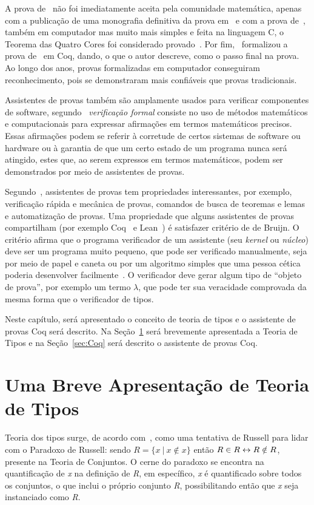 	A prova de~ não foi imediatamente aceita pela comunidade matemática, apenas com a publicação de uma monografia definitiva da prova
	em~ e com a prova de~, também em computador mas muito mais simples e feita na linguagem C, o Teorema
	das Quatro Cores foi considerado provado~\cite{gonthier2005computer}. Por fim,~ formalizou a prova de~ em Coq, dando,
	o que o autor descreve, como o passo final na prova. Ao longo dos anos, provas formalizadas em computador conseguiram reconhecimento, pois se
	demonstraram mais confiáveis que provas tradicionais.

	Assistentes de provas também são amplamente usados para verificar componentes de software, segundo~ \textit{verificação formal}
	consiste no uso de métodos matemáticos e computacionais para expressar afirmações em termos matemáticos precisos. Essas afirmações podem se referir à corretude
	de certos sistemas de software ou hardware ou à garantia de que um certo estado de um programa nunca será atingido, estes que, ao serem expressos em termos matemáticos,
	podem ser demonstrados por meio de assistentes de provas.

	Segundo~, assistentes de provas tem propriedades interessantes, por exemplo, verificação rápida e mecânica de provas,
	comandos de busca de teoremas e lemas e automatização de provas. Uma propriedade que alguns assistentes de provas compartilham
	(por exemplo Coq~\cite{coqteam2022manual} e Lean~\cite{avigad2017theorem,demoura2015lean}) é satisfazer critério de de Bruijn. O critério afirma que o programa
	verificador de um assistente (seu \textit{kernel} ou \textit{núcleo}) deve ser um programa muito pequeno, que pode ser verificado manualmente, seja por meio de papel e caneta ou por
	um algoritmo simples que uma pessoa cética poderia desenvolver facilmente~\cite{barendregt2001proof}. O verificador deve gerar algum tipo de ``objeto de prova'',
	por exemplo um termo \(\lambda\), que pode ter sua veracidade comprovada da mesma forma que o verificador de tipos.

	Neste capítulo, será apresentado o conceito de teoria de tipos e o assistente de provas Coq será descrito. Na Seção~\ref{sec:TeoriaTipos} será
	brevemente apresentada a Teoria de Tipos e na Seção~\ref{sec:Coq} será descrito o assistente de provas Coq.

	\section{Uma Breve Apresentação de Teoria de Tipos}
		\label{sec:TeoriaTipos}
		Teoria dos tipos surge, de acordo com~, como uma tentativa de Russell para lidar com o Paradoxo de Russell:
		sendo \(R = \{ x \ | \ x \notin x\}\) então \( R \in R \leftrightarrow R \notin R\), presente na Teoria de Conjuntos.
		O cerne do paradoxo se encontra na quantificação de \textit{x} na definição de \textit{R}, em específico, \textit{x} é quantificado sobre
		todos os conjuntos, o que inclui o próprio conjunto \textit{R}, possibilitando então que \textit{x} seja instanciado como \textit{R}.

